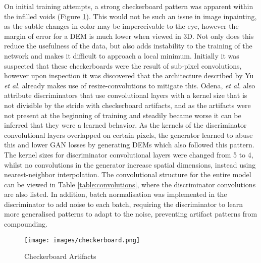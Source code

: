 \documentclass[twocolumn]{article}
\begin{document}
On initial training attempts, a strong checkerboard pattern was apparent within the infilled voids (Figure \ref{fig:checkerboard}).
This would not be such an issue in image inpainting, as the subtle changes in color may be imperceivable to the eye, however the margin of error for a DEM is much lower when viewed in 3D.
Not only does this reduce the usefulness of the data, but also adds instability to the training of the network and makes it difficult to approach a local minimum.
Initially it was suspected that these checkerboards were the result of sub-pixel convolutions\autocite{aitkenCheckerboardArtifactFree2017}, however upon inspection it was discovered that the architecture described by Yu \emph{et al.} already makes use of resize-convolutions\autocite{odenaDeconvolutionCheckerboardArtifacts2016} to mitigate this.
Odena, \emph{et al.}\autocite{odenaDeconvolutionCheckerboardArtifacts2016} also attribute discriminators that use convolutional layers with a kernel size that is not divisible by the stride with checkerboard artifacts, and as the artifacts were not present at the beginning of training and steadily became worse it can be inferred that they were a learned behavior.
As the kernels of the discriminator convolutional layers overlapped on certain pixels, the generator learned to abuse this and lower GAN losses by generating DEMs which also followed this pattern.
The kernel sizes for discriminator convolutional layers were changed from 5 to 4, whilst no convolutions in the generator increase spatial dimensions, instead using nearest-neighbor interpolation.
The convolutional structure for the entire model can be viewed in Table \ref{table:convolutions}, where the discriminator convolutions are also listed.
In addition, batch normalisation was implemented in the discriminator to add noise to each batch, requiring the discriminator to learn more generalised patterns to adapt to the noise, preventing artifact patterns from compounding.

\begin{figure}[htbp]
\centering
\texttt{[image: images/checkerboard.png]}
\caption{\label{fig:checkerboard}Checkerboard Artifacts}
\end{figure}
\end{document}

